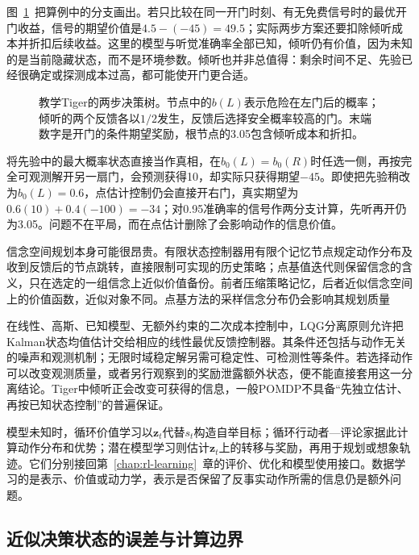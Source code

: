 图~\ref{fig:rl-information-tiger}~把算例中的分支画出。若只比较在同一开门时刻、有无免费信号时的最优开门收益，信号的期望价值是$4.5-(-45)=49.5$；实际两步方案还要扣除倾听成本并折扣后续收益。这里的模型与听觉准确率全部已知，倾听仍有价值，因为未知的是当前隐藏状态，而不是环境参数。倾听也并非总值得：剩余时间不足、先验已经很确定或探测成本过高，都可能使开门更合适。

\begin{figure}[htbp]
  \centering
  
  \caption{教学Tiger的两步决策树。节点中的$b(L)$表示危险在左门后的概率；倾听的两个反馈各以$1/2$发生，反馈后选择安全概率较高的门。末端数字是开门的条件期望奖励，根节点的3.05包含倾听成本和折扣。}
  \label{fig:rl-information-tiger}
\end{figure}

将先验中的最大概率状态直接当作真相，在$b_0(L)=b_0(R)$时任选一侧，再按完全可观测解开另一扇门，会预测获得10，却实际只获得期望$-45$。即使把先验稍改为$b_0(L)=0.6$，点估计控制仍会直接开右门，真实期望为$0.6(10)+0.4(-100)=-34$；对0.95准确率的信号作两分支计算，先听再开仍为3.05。问题不在平局，而在点估计删除了会影响动作的信息价值。

信念空间规划本身可能很昂贵。有限状态控制器用有限个记忆节点规定动作分布及收到反馈后的节点跳转，直接限制可实现的历史策略；点基值迭代则保留信念的含义，只在选定的一组信念上近似价值备份。前者压缩策略记忆，后者近似信念空间上的价值函数，近似对象不同。点基方法的采样信念分布仍会影响其规划质量

在线性、高斯、已知模型、无额外约束的二次成本控制中，LQG分离原则允许把Kalman状态均值估计交给相应的线性最优反馈控制器。其条件还包括与动作无关的噪声和观测机制；无限时域稳定解另需可稳定性、可检测性等条件。若选择动作可以改变观测质量，或者另行观察到的奖励泄露额外状态，便不能直接套用这一分离结论。Tiger中倾听正会改变可获得的信息，一般POMDP不具备“先独立估计、再按已知状态控制”的普遍保证。

模型未知时，循环价值学习以$\bm z_t$代替$s_t$构造自举目标；循环行动者—评论家据此计算动作分布和优势；潜在模型学习则估计$\bm z_t$上的转移与奖励，再用于规划或想象轨迹。它们分别接回第~\ref{chap:rl-learning}~章的评价、优化和模型使用接口。数据学习的是表示、价值或动力学，表示是否保留了反事实动作所需的信息仍是额外问题。

\subsection{近似决策状态的误差与计算边界}
\label{sec:rl-information-memory-errors}

